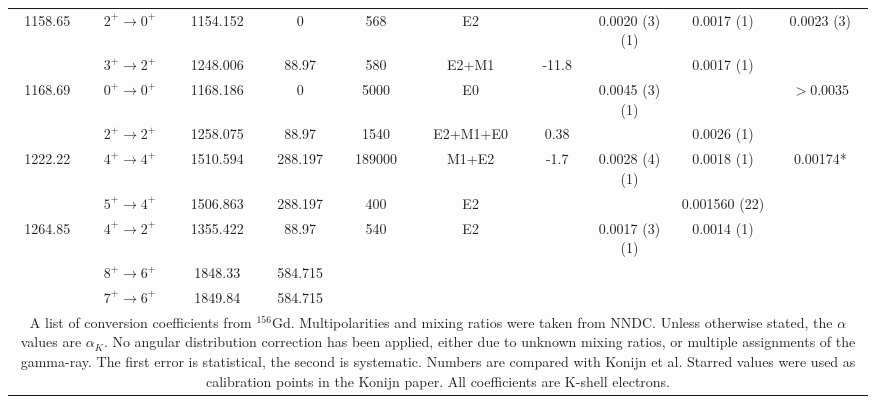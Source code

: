 \begin{landscape}
\begin{longtable}{c|c|c|c|c|c|c|c|c|c}
1158.65	&	$2^+	\rightarrow	0^+$	&	1154.152	&	0	&	568	&	E2	&		&	0.0020 (3) (1)	&	0.0017 (1)	&	0.0023 (3)	\\
	&	$3^+	\rightarrow	2^+$	&	1248.006	&	88.97	&	580	&	E2+M1	&	-11.8	&		&	0.0017 (1)	&		\\ \hline
1168.69	&	$0^+	\rightarrow	0^+$	&	1168.186	&	0	&	5000	&	E0	&		&	0.0045 (3) (1)	&		&	$>0.0035$	\\
	&	$2^+	\rightarrow	2^+$	&	1258.075	&	88.97	&	1540	&	E2+M1+E0	&	0.38	&		&	0.0026 (1)	&		\\ \hline
1222.22	&	$4^+	\rightarrow	4^+$	&	1510.594	&	288.197	&	189000	&	M1+E2	&	-1.7	&	0.0028 (4) (1)	&	0.0018 (1)	&	0.00174*	\\
	&	$5^+	\rightarrow	4^+$	&	1506.863	&	288.197	&	400	&	E2	&		&		&	0.001560 (22)	&	\\ \hline
1264.85	&	$4^+	\rightarrow	2^+$	&	1355.422	&	88.97	&	540	&	E2	&		&	0.0017 (3) (1)	&	0.0014 (1)	&	\\
	&	$8^+	\rightarrow	6^+$	&	1848.33	&	584.715	&		&		&		&		&		&		\\
	&	$7^+	\rightarrow	6^+$	&	1849.84	&	584.715	&		&		&		&		&		&		\\ \bottomrule
	\multicolumn{10}{p{1.4\textwidth}}{A list of conversion coefficients from $^{156}$Gd. Multipolarities and mixing ratios were taken from NNDC. Unless otherwise stated, the $\alpha$ values are $\alpha_K$. No angular distribution correction has been applied, either due to unknown mixing ratios, or multiple assignments of the gamma-ray. The first error is statistical, the second is systematic. Numbers are compared with Konijn et al. \citep{konijn81:_156gd} Starred values were used as calibration points in the Konijn paper. All coefficients are K-shell electrons.}
    \end{longtable}
\end{landscape}